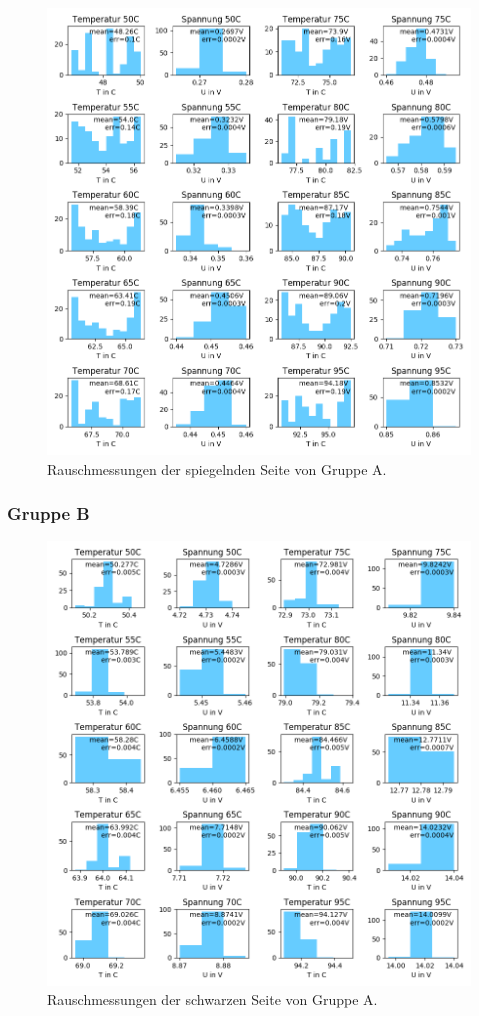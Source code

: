 \documentclass[12pt,a4paper]{article}
\begin{document}
\begin{figure}[h]
\includegraphics[scale=0.8]{Bilder/Rauschen_A_spiegel_2.png}
\caption{Rauschmessungen der spiegelnden Seite von Gruppe A.}
\label{fig:RegSpiegel}
\end{figure}

\subsubsection{Gruppe B}

\begin{figure}[h]
\includegraphics[scale=0.8]{Bilder/Rauschen_B_schwarz_2.png}
\caption{Rauschmessungen der schwarzen Seite von Gruppe A.}
\label{fig:RegSpiegel}
\end{figure}
\end{document}
